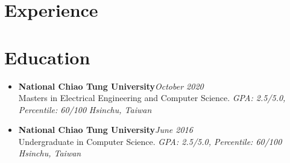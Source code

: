 \section{Experience}
\fi
\section{\sectionheading Education}

\begin{itemize}[leftmargin=0pt, label={}]%

\item{
{\sectionheading\large{\textbf{National Chiao Tung University}}}\hfill {\sectionheading\small{\textit{October 2020}}}\\
{\sectionheading\small{Masters in Electrical Engineering and Computer Science. \textit{GPA: 2.5/5.0, Percentile: 60/100}}}\hfill
{\sectionheading\small{\textit{Hsinchu, Taiwan}}}

}
\item{
{\sectionheading\large{\textbf{National Chiao Tung University}}}\hfill {\sectionheading\small{\textit{June 2016}}}\\
{\sectionheading\small{Undergraduate in Computer Science. \textit{GPA: 2.5/5.0, Percentile: 60/100}}}\hfill
{\sectionheading\small{\textit{Hsinchu, Taiwan}}}

}

\end{itemize}
